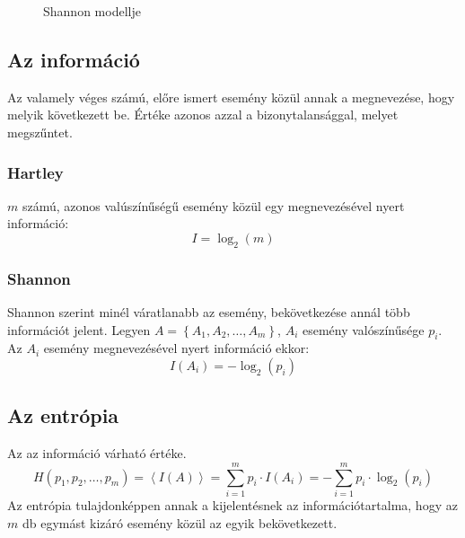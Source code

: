 \documentclass[../main.tex]{subfiles}
\begin{document}
\begin{figure}[htb]
  \caption{Shannon modellje}
  \label{fig:shannon}
\end{figure}

\subsection{Az információ}

Az  valamely véges számú, előre ismert esemény közül annak a
megnevezése, hogy melyik következett be.
Értéke azonos azzal a bizonytalansággal, melyet megszűntet.

\subsubsection*{Hartley}

$m$ számú, azonos valúszínűségű esemény közül
egy megnevezésével nyert információ:
\[
  I = \log_2(m)
\]

\subsubsection*{Shannon}

Shannon szerint minél váratlanabb az esemény, bekövetkezése
annál több információt jelent. Legyen
$A = \left\{ A_1, A_2, \dots, A_m \right\}$,
$A_i$ esemény valószínűsége $p_i$.
Az $A_i$ esemény megnevezésével nyert információ ekkor:
\[
  I \left( A_i \right) = -\log_2 \left( p_i \right)
\]

\subsection{Az entrópia}

Az  az információ várható értéke.
\[
  H(p_1, p_2, \dots, p_m) =
  \left\langle I(A) \right\rangle =
  \sum_{i=1}^m p_i \cdot I \left( A_i \right) =
  - \sum_{i=1}^m p_i \cdot \log_2(p_i)
\]
Az entrópia tulajdonképpen annak a kijelentésnek az információtartalma,
hogy az $m$ db egymást kizáró esemény közül az egyik bekövetkezett.
\end{document}
